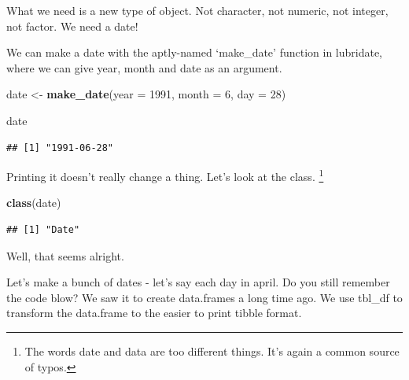 \documentclass[]{tufte-book}
\newenvironment{Shaded}{}{}
\newcommand{\DataTypeTok}[1]{\textcolor[rgb]{0.56,0.13,0.00}{#1}}
\newcommand{\DecValTok}[1]{\textcolor[rgb]{0.25,0.63,0.44}{#1}}
\newcommand{\KeywordTok}[1]{\textcolor[rgb]{0.00,0.44,0.13}{\textbf{#1}}}
\newcommand{\NormalTok}[1]{#1}
\newcommand{\OperatorTok}[1]{\textcolor[rgb]{0.40,0.40,0.40}{#1}}
\newcommand{\StringTok}[1]{\textcolor[rgb]{0.25,0.44,0.63}{#1}}
\begin{document}
What we need is a new type of object. Not character, not numeric, not integer, not factor. We need a date!

We can make a date with the aptly-named `make\_date' function in lubridate, where we can give year, month and date as an argument.

\begin{Shaded}
\begin{Highlighting}[]
\NormalTok{date <-}\StringTok{ }\KeywordTok{make_date}\NormalTok{(}\DataTypeTok{year =} \DecValTok{1991}\NormalTok{, }\DataTypeTok{month =} \DecValTok{6}\NormalTok{, }\DataTypeTok{day =} \DecValTok{28}\NormalTok{)}
\end{Highlighting}
\end{Shaded}

\begin{Shaded}
\begin{Highlighting}[]
\NormalTok{date}
\end{Highlighting}
\end{Shaded}

\begin{verbatim}
## [1] "1991-06-28"
\end{verbatim}

Printing it doesn't really change a thing. Let's look at the class. \footnote{The words date and data are too different things. It's again a common source of typos.}

\begin{Shaded}
\begin{Highlighting}[]
\KeywordTok{class}\NormalTok{(date)}
\end{Highlighting}
\end{Shaded}

\begin{verbatim}
## [1] "Date"
\end{verbatim}

Well, that seems alright.

Let's make a bunch of dates - let's say each day in april. Do you still remember the code blow? We saw it to create data.frames a long time ago. We use tbl\_df to transform the data.frame to the easier to print tibble format.

\begin{Shaded}
\end{Shaded}
\end{document}

